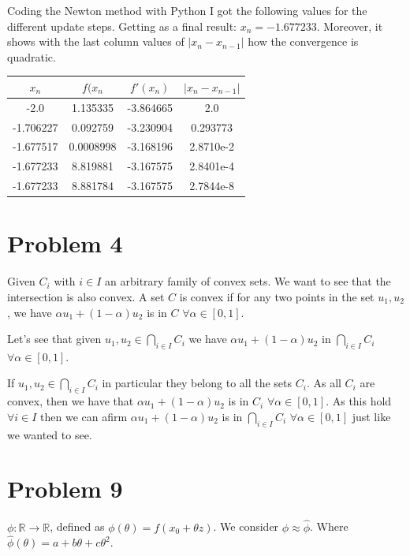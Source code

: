 \documentclass[12pt,letterpaper]{article}
\theoremstyle{definition}
\begin{document}
Coding the Newton method with Python I got the following values for the different update steps. Getting as a final result: $x_n=-1.677233$. Moreover, it shows with the last column values of $|x_n-x_{n-1}|$ how the convergence is quadratic.
    \begin{table}[H]
    \centering
\begin{tabular}{c|c|c|c}
$x_n$ & $f(x_n$ & $f'(x_n)$ & $|x_n-x_{n-1}|$ \\
\hline
-2.0                      & 1.135335                    & -3.864665 & 2.0             \\
-1.706227                 & 0.092759                    & -3.230904 & 0.293773        \\
-1.677517                 & 0.0008998                   & -3.168196 & 2.8710e-2       \\
-1.677233                 & 8.819881                    & -3.167575 & 2.8401e-4       \\
-1.677233                 & 8.881784                    & -3.167575 & 2.7844e-8      
\end{tabular}
\end{table}


\section*{Problem 4} 

Given $C_i$ with $i \in I$ an arbitrary family of convex sets. We want to see that the intersection is also convex. A set $C$ is convex if for any two points in the set $u_1, u_2$, we have $\alpha u_1 + (1-\alpha) u_2 $ is in $C$ $\forall \alpha \in [0,1]$. 

Let's see that given $ u_1, u_2 \in \bigcap_{i\in I} C_i$ we have $\alpha u_1 + (1-\alpha) u_2 $ in $\bigcap_{i\in I} C_i$ $\forall \alpha \in [0,1]$. 

If $ u_1, u_2 \in \bigcap_{i\in I} C_i$ in particular they belong to all the sets $C_i$. As all $C_i$ are convex, then we have that $\alpha u_1 + (1-\alpha) u_2 $ is in $C_i$ $\forall \alpha \in [0,1]$. As this hold $\forall i \in I$ then we can afirm $\alpha u_1 + (1-\alpha) u_2 $ is in $\bigcap_{i\in I} C_i$ $\forall \alpha \in [0,1]$ just like we wanted to see. 

\section*{Problem 9}
 $\phi: \mathbb{R} \to \mathbb{R}$, defined as $\phi(\theta) = f(x_0+ \theta z)$. We consider $\phi \approx \hat{\phi}$. Where $\hat{\phi}(\theta) = a + b\theta + c \theta ^2 $.
 
\end{document}
